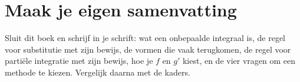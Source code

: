 \begin{oefeningen}






\end{oefeningen}


\ifzelfstudie
\section*{Maak je eigen samenvatting}
Sluit dit boek en schrijf in je schrift: wat een onbepaalde integraal is, de regel voor substitutie met zijn bewijs, de vormen die vaak terugkomen, de regel voor partiële integratie met zijn bewijs, hoe je $f$ en $g'$ kiest, en de vier vragen om een methode te kiezen. Vergelijk daarna met de kaders.
\fi
